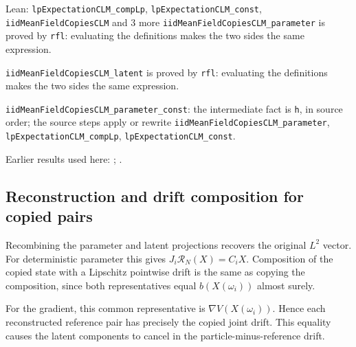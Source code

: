\documentclass[11pt,a4paper]{report}
\begin{document}
\begin{leanbox}{Lean: \texttt{lpExpectationCLM\_\allowbreak{}compLp}, \texttt{lpExpectationCLM\_\allowbreak{}const}, \texttt{iidMeanFieldCopiesCLM} and 3 more}
\texttt{iid\allowbreak{}Mean\allowbreak{}Field\allowbreak{}Copies\allowbreak{}CLM\_\allowbreak{}parameter} is proved by \texttt{rfl}: evaluating the definitions makes the two sides the same expression.



\texttt{iid\allowbreak{}Mean\allowbreak{}Field\allowbreak{}Copies\allowbreak{}CLM\_\allowbreak{}latent} is proved by \texttt{rfl}: evaluating the definitions makes the two sides the same expression.



\texttt{iid\allowbreak{}Mean\allowbreak{}Field\allowbreak{}Copies\allowbreak{}CLM\_\allowbreak{}parameter\_\allowbreak{}const}: the intermediate fact is \texttt{h}, in source order; the source steps apply or rewrite \texttt{iid\allowbreak{}Mean\allowbreak{}Field\allowbreak{}Copies\allowbreak{}CLM\_\allowbreak{}parameter}, \texttt{lp\allowbreak{}Expectation\allowbreak{}CLM\_\allowbreak{}comp\allowbreak{}Lp}, \texttt{lp\allowbreak{}Expectation\allowbreak{}CLM\_\allowbreak{}const}.
\end{leanbox}


Earlier results used here: \cite[Section~3.1.1]{LangevinLean2026IPLA}; \cite[Section~3.11.1]{LangevinLean2026IPLA}.
\subsection{\texorpdfstring{Reconstruction and drift composition for copied pairs}{Reconstruction and drift composition for copied pairs}}
\label{report-step-ProximalLangevin-MeanFieldCopies-lean-4}


Recombining the parameter and latent projections recovers the original \(L^2\) vector. For deterministic parameter this gives \(J_i\mathcal R_N(X)=C_iX\). Composition of the copied state with a Lipschitz pointwise drift is the same as copying the composition, since both representatives equal \(b(X(\omega_i))\) almost surely.



For the gradient, this common representative is \(\nabla V(X(\omega_i))\). Hence each reconstructed reference pair has precisely the copied joint drift. This equality causes the latent components to cancel in the particle-minus-reference drift.
\end{document}
